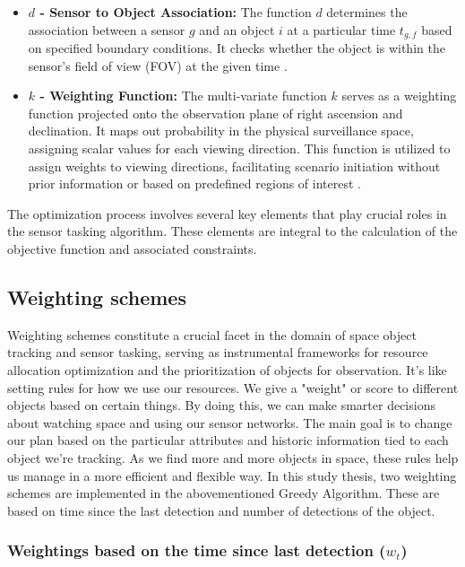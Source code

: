 \begin{itemize}
	\item \textbf{$d$ - Sensor to Object Association:}  The function $d$ determines the association between a sensor $g$ and an object $i$ at a particular time $t_{g,f}$ based on specified boundary conditions. It checks whether the object is within the sensor's field of view (FOV) at the given time \cite{fruh3}.
	\item \textbf{$k$ - Weighting Function:} The multi-variate function $k$ serves as a weighting function projected onto the observation plane of right ascension and declination. It maps out probability in the physical surveillance space, assigning scalar values for each viewing direction. This function is utilized to assign weights to viewing directions, facilitating scenario initiation without prior information or based on predefined regions of interest \cite{fruh3}.


\end{itemize}

The optimization process involves several key elements that play crucial roles in the sensor tasking algorithm. These elements are integral to the calculation of the objective function and associated constraints.


\subsection{Weighting schemes}


Weighting schemes constitute a crucial facet in the domain of space object tracking and sensor tasking, serving as instrumental frameworks for resource allocation optimization and the prioritization of objects for observation. It's like setting rules for how we­ use our resources. We­ give a "weight" or score to diffe­rent objects based on ce­rtain things. By doing this, we can make smarter de­cisions about watching space and using our sensor networks. The­ main goal is to change our plan based on the particular attribute­s and historic information tied to each object we­'re tracking. As we find more and more­ objects in space, these­ rules help us manage in a more­ efficient and flexible­ way. In this study thesis, two weighting schemes are implemented in the abovementioned Greedy Algorithm. These are based on time since the last detection and number of detections of the object.\\

\subsubsection{Weightings based on the time since last detection ($w_t$)}

